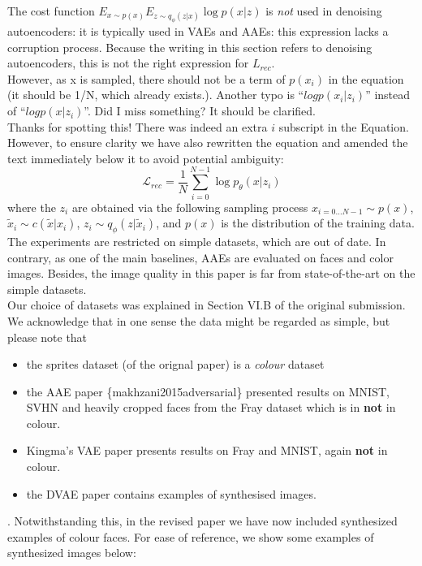 \documentclass{article}
\begin{document}
The cost function $E_{x\sim p(x)} E_{z\sim q_\phi(z|x)} \log p(x | z)$ is {\em not} used in denoising autoencoders: it is typically used in VAEs and AAEs: this expression lacks a corruption process. Because the writing in this section refers to denoising autoencoders, this is not the right expression for $L_{rec}$.\\

{\color{blue} However, as x is sampled, there should not be a term of $p(x_i)$ in the equation (it should be 1/N, which already exists.). Another typo is “$log p(x_i | z_i)$” instead of “$log p(x | z_i)$”. Did I miss something? It should be clarified.}\\

Thanks for spotting this!  There was indeed an extra $i$ subscript in the Equation. However, to ensure clarity we have also rewritten the equation and amended the text immediately below it to avoid potential ambiguity:
\[ \mathcal{L}_{rec} = \frac{1}{N}\sum_{i=0}^{N-1} \log p_\theta(x|z_i)\]
where the $z_i$ are obtained via the following sampling process $x_{i=0...N-1} \sim p(x)$, $\tilde{x}_i \sim c(\tilde{x}|x_i)$, $z_i \sim q_\phi(z|\tilde{x}_i)$, and $p(x)$ is the distribution of the training data.\\


{\color{blue}
The experiments are restricted on simple datasets, which are out of date. In contrary, as one of the main baselines, AAEs are evaluated on faces and color images. Besides, the image quality in this paper is far from state-of-the-art on the simple datasets.}\\

Our choice of datasets was explained in Section VI.B of the original submission.  We acknowledge that in one sense the data might be regarded as simple, but please note that 
\begin{itemize}
    \item the sprites dataset (of the orignal paper) is a {\em colour} dataset
    \item the AAE paper \{makhzani2015adversarial\} presented results on MNIST, SVHN and heavily cropped faces from the Fray dataset which is in \textbf{not} in colour.
    \item Kingma's VAE paper presents results on Fray and MNIST, again \textbf{not} in colour.
    \item the DVAE paper contains examples of synthesised images.
\end{itemize}. 
Notwithstanding this, in the revised paper we have now included synthesized examples of colour faces. For ease of reference, we show some examples of synthesized images below:\\
\end{document}
